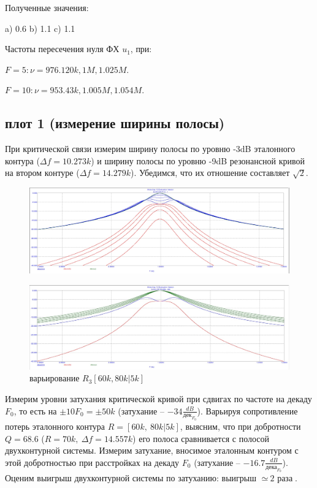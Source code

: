 \documentclass[a4paper, 14pt]{extarticle}%
\begin{document}
Полученные значения:

a) 0.6
b) 1.1
c) 1.1

Частоты пересечения нуля ФХ $u_1$, при:

$F = 5: \nu = 976.120k, 1M, 1.025M$.

$F = 10: \nu = 953.43k, 1.005M, 1.054M$. 

\subsection{плот 1 (измерение ширины полосы)}

При критической связи измерим ширину полосы по уровню -3dB эталонного контура ($\Delta f = 10.273k$) и ширину полосы по уровню -9dB резонансной кривой на втором контуре ($\Delta f = 14.279k$). Убедимся, что их отношение составляет $\sqrt{2}$.


\begin{figure}[h!]
	\centering
			\includegraphics[width=1.1\linewidth]{1.5.jpg}
	\label{A}
\end{figure}

\begin{figure}[h!]
	\centering
			\includegraphics[width=1.1\linewidth]{1.5varR1.jpg}
            \caption{варьирование $R_3 [60k, 80k|5k]$}
	\label{A}
\end{figure}


Измерим уровни затухания критической кривой при сдвигах по частоте на декаду $F_0$, то есть на $\pm 10F_0 = \pm 50k$ (затухание -- $-34\frac{dB}{\text{дек}_{F_0}}$). Варьируя сопротивление потерь эталонного контура $R = [60k,~80k|5k]$, выясним, что при добротности $Q = 68.6$ ($R = 70k,~\Delta f = 14.557k$) его полоса сравнивается с полосой двухконтурной системы. Измерим затухание, вносимое эталонным контуром с этой добротностью при расстройках на декаду $F_0$ (затухание -- $-16.7\frac{dB}{\text{дека}_{F_0}}$). Оценим выигрыш двухконтурной системы по затуханию: выигрыш $\simeq~\text{2 раза}$.
\end{document}
